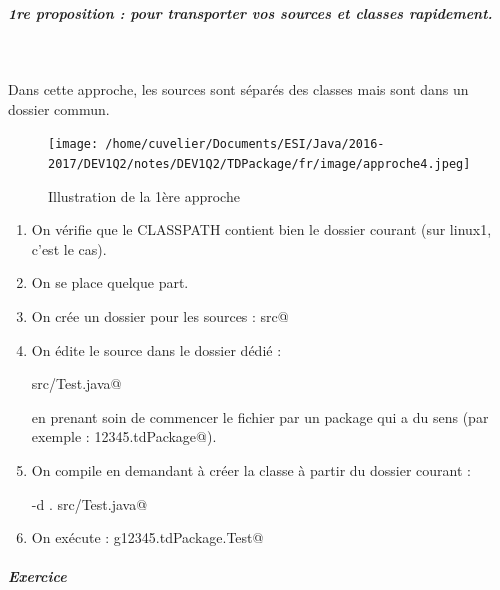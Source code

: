\documentclass[11pt,a4paper]{article}
\begin{document}
			
		\subparagraph{1re proposition : pour transporter vos sources et classes rapidement.} 
		
					\textcolor{white}{.} \par
				
            \par
        
				Dans cette approche, les sources sont s\'epar\'es des classes
				mais sont dans un dossier commun.
			
            \par
        \begin{figure}[hbt]
				    \begin{center}
					\texttt{[image: /home/cuvelier/Documents/ESI/Java/2016-2017/DEV1Q2/notes/DEV1Q2/TDPackage/fr/image/approche4.jpeg]}
						\end{center}
                
                    \caption[Illustration de la 1\`ere approche]{Illustration de la 1\`ere approche}
                \end{figure}
                    
					\begin{enumerate}
				
			\item 
					On v\'erifie que le CLASSPATH contient bien le 
					dossier courant (sur linux1, c'est le cas).
				
			\item 
					On se place quelque part.
				
			\item 
					On cr\'ee un dossier pour les sources : \verb@mkdir src@
			\item 
					On \'edite le source dans le dossier d\'edi\'e : 
					\par
				\verb@nano src/Test.java@\par
				
					en prenant soin de commencer le fichier par un package qui a du sens
					(par exemple : \verb@g12345.tdPackage@).
				
			\item 
					On compile en demandant \`a cr\'eer la classe \`a partir
					du dossier courant : 
					\par
				\verb@javac -d . src/Test.java@
			\item 
					On ex\'ecute : \verb@java g12345.tdPackage.Test@
					\end{enumerate}
				
			
		\subparagraph{Exercice} 
		
\end{document}
